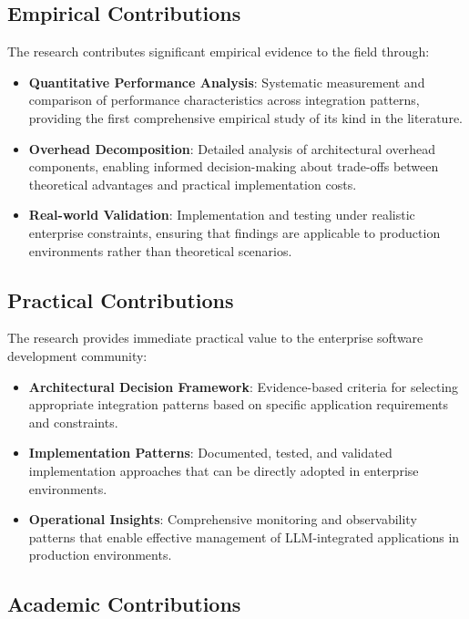 \subsection{Empirical Contributions}

The research contributes significant empirical evidence to the field through:

\begin{itemize}
    \item \textbf{Quantitative Performance Analysis}: Systematic measurement and comparison of performance characteristics across integration patterns, providing the first comprehensive empirical study of its kind in the literature.
    \item \textbf{Overhead Decomposition}: Detailed analysis of architectural overhead components, enabling informed decision-making about trade-offs between theoretical advantages and practical implementation costs.
    \item \textbf{Real-world Validation}: Implementation and testing under realistic enterprise constraints, ensuring that findings are applicable to production environments rather than theoretical scenarios.
\end{itemize}

\subsection{Practical Contributions}

The research provides immediate practical value to the enterprise software development community:

\begin{itemize}
    \item \textbf{Architectural Decision Framework}: Evidence-based criteria for selecting appropriate integration patterns based on specific application requirements and constraints.
    \item \textbf{Implementation Patterns}: Documented, tested, and validated implementation approaches that can be directly adopted in enterprise environments.
    \item \textbf{Operational Insights}: Comprehensive monitoring and observability patterns that enable effective management of LLM-integrated applications in production environments.
\end{itemize}

\subsection{Academic Contributions}

